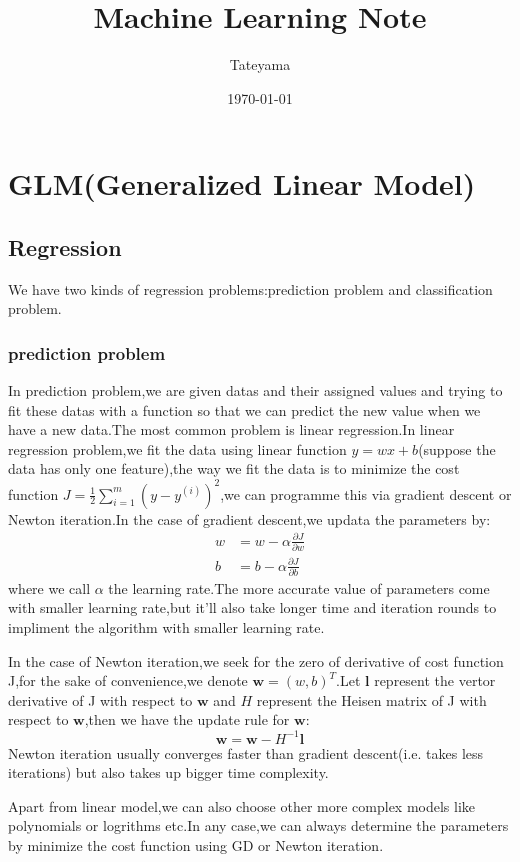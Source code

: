\documentclass[a4paper,12pt]{article}
\begin{document}
\title{Machine Learning Note}
\author{Tateyama}
\date{\today}
\maketitle
\section{GLM(Generalized Linear Model)}
\subsection{Regression}
We have two kinds of regression problems:prediction problem and classification problem.
\subsubsection{prediction problem}
In prediction problem,we are given datas and their assigned values and trying to fit these datas with a function so that we can predict the new value when we have a new data.The most common problem is linear regression.In linear regression problem,we fit the data using linear function $y=wx+b$(suppose the data has only one feature),the way we fit the data is to minimize the cost function
$J = \frac{1}{2}\sum_{i=1}^{m}(y-y^{(i)})^2$,we can programme this via gradient descent or Newton iteration.In the case of gradient descent,we updata the parameters by:
\begin{align*}
	w &= w - \alpha \frac{\partial J}{\partial w} \\
	b &= b - \alpha \frac{\partial J}{\partial b}
\end{align*}
where we call $\alpha$ the learning rate.The more accurate value of parameters come with smaller learning rate,but it'll also take longer time and iteration rounds to impliment the algorithm with smaller learning rate.

In the case of Newton iteration,we seek for the zero of derivative of cost function J,for the sake of convenience,we denote $\bm{w}=(w,b)^{T}$.Let $\bm{l}$ represent the vertor derivative of J with respect to $\bm{w}$ and $H$ represent the Heisen matrix of J with respect to $\bm{w}$,then we have the update rule for $\bm{w}$:$$\bm{w}=\bm{w}-H^{-1}\bm{l}$$Newton iteration usually converges faster than gradient descent(i.e. takes less iterations) but also takes up bigger time complexity.

Apart from linear model,we can also choose other more complex models like polynomials or logrithms etc.In any case,we can always determine the parameters by minimize the cost function using GD or Newton iteration.
\end{document}
